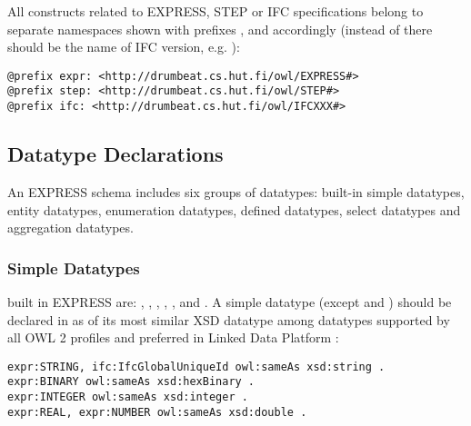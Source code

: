 All constructs related to EXPRESS, STEP or IFC specifications belong to separate namespaces shown with prefixes ,  and  accordingly (instead of  there should be the name of IFC version, e.g. ):

\begin{lstlisting}
@prefix expr: <http://drumbeat.cs.hut.fi/owl/EXPRESS#>
@prefix step: <http://drumbeat.cs.hut.fi/owl/STEP#>
@prefix ifc: <http://drumbeat.cs.hut.fi/owl/IFCXXX#>
\end{lstlisting}




\subsection{Datatype Declarations}
\label{subsec:ifcOWL-types}

An EXPRESS schema includes six groups of data\-types: built-in simple data\-types, entity data\-types, enumeration data\-types, defined data\-types, select data\-types and aggregation data\-types.



\subsubsection{Simple Datatypes} built in EXPRESS are: , , , , ,  and . A simple data\-type (except  and ) should be declared in \ifcowl{} as  of its most similar XSD data\-type among data\-types supported by all OWL 2 profiles \cite{motik2012owl} and preferred in Linked Data Platform \cite{ldp-best-practices}:

\begin{lstlisting}
expr:STRING, ifc:IfcGlobalUniqueId owl:sameAs xsd:string .
expr:BINARY owl:sameAs xsd:hexBinary .
expr:INTEGER owl:sameAs xsd:integer .
expr:REAL, expr:NUMBER owl:sameAs xsd:double .
\end{lstlisting}


